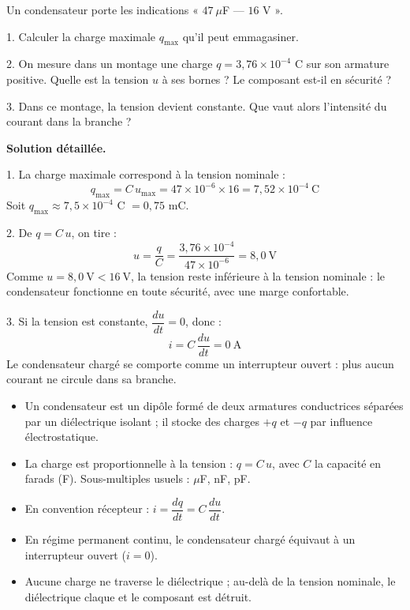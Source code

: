 \documentclass[11pt]{article}
\begin{document}
\begin{exoresolu}
Un condensateur porte les indications « $47~\mu$F — $16$ V ».

1. Calculer la charge maximale $q_{\max}$ qu'il peut emmagasiner.

2. On mesure dans un montage une charge $q = 3,76\times 10^{-4}$ C sur son armature positive. Quelle est la tension $u$ à ses bornes ? Le composant est-il en sécurité ?

3. Dans ce montage, la tension devient constante. Que vaut alors l'intensité du courant dans la branche ?

\tcblower
\textbf{Solution détaillée.}

1. La charge maximale correspond à la tension nominale :
\[ q_{\max} = C\,u_{\max} = 47\times 10^{-6} \times 16 = 7,52\times 10^{-4}~\text{C} \]
Soit $q_{\max} \approx 7,5\times 10^{-4}$ C $= 0,75$ mC.

2. De $q = C\,u$, on tire :
\[ u = \frac{q}{C} = \frac{3,76\times 10^{-4}}{47\times 10^{-6}} = 8,0~\text{V} \]
Comme $u = 8,0~\text{V} < 16~\text{V}$, la tension reste inférieure à la tension nominale : le condensateur fonctionne en toute sécurité, avec une marge confortable.

3. Si la tension est constante, $\dfrac{du}{dt} = 0$, donc :
\[ i = C\,\frac{du}{dt} = 0~\text{A} \]
Le condensateur chargé se comporte comme un interrupteur ouvert : plus aucun courant ne circule dans sa branche.
\end{exoresolu}

\begin{aretenir}
\begin{itemize}
\item Un condensateur est un dipôle formé de deux armatures conductrices séparées par un diélectrique isolant ; il stocke des charges $+q$ et $-q$ par influence électrostatique.
\item La charge est proportionnelle à la tension : $q = C\,u$, avec $C$ la capacité en farads (F). Sous-multiples usuels : $\mu$F, nF, pF.
\item En convention récepteur : $i = \dfrac{dq}{dt} = C\,\dfrac{du}{dt}$.
\item En régime permanent continu, le condensateur chargé équivaut à un interrupteur ouvert ($i = 0$).
\item Aucune charge ne traverse le diélectrique ; au-delà de la tension nominale, le diélectrique claque et le composant est détruit.
\end{itemize}
\end{aretenir}
\end{document}
